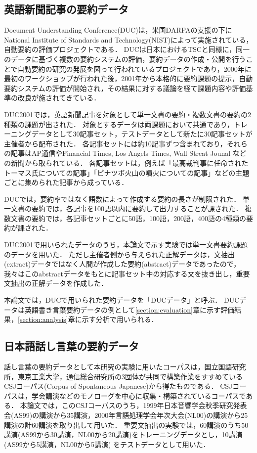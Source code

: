 \subsection{英語新聞記事の要約データ}
\label{section:data_duc}

Document Understanding Conference(DUC)は，米国DARPAの支援の下にNational Institute of Standards and Technology(NIST)によって実施されている，自動要約の評価プロジェクトである\cite{DUC:2001}．
DUCは日本におけるTSCと同様に，同一のデータに基づく複数の要約システムの評価，要約データの作成・公開を行うことで自動要約の研究の発展を図って行われているプロジェクトであり，2000年に最初のワークショップが行われた後，2001年から本格的に要約課題の提示，自動要約システムの評価が開始され，その結果に対する議論を経て課題内容や評価基準の改良が施されてきている．

DUC2001では，英語新聞記事を対象として単一文書の要約・複数文書の要約の2種類の課題が出された．
対象とするデータは両課題において共通であり，トレーニングデータとして30記事セット，テストデータとして新たに30記事セットが主催者から配布された．
各記事セットには約10記事ずつ含まれており，それらの記事はAP通信やFinancial Times, Los Angels Times, Wall Streat Jounal などの新聞から取られている．
各記事セットは，例えば「最高裁判事に任命されたトーマス氏についての記事」「ピナツボ火山の噴火についての記事」などの主題ごとに集められた記事から成っている．

DUCでは，要約率ではなく語数によって作成する要約の長さが制限された．
単一文書の要約では，各記事を100語以内に要約して出力することが課された．
複数文書の要約では，各記事セットごとに50語，100語，200語，400語の4種類の要約が課された．

DUC2001で用いられたデータのうち，本論文で示す実験では単一文書要約課題のデータを用いた．
ただし主催者側から与えられた正解データは，文抽出(extract)データではなく人間が作成した要約(abstract)データであったので，我々はこのabstractデータをもとに記事セット中の対応する文を抜き出し，重要文抽出の正解データを作成した．

本論文では，DUCで用いられた要約データを「DUCデータ」と呼ぶ．
DUCデータは英語書き言葉要約データの例として\ref{section:evaluation}章に示す評価結果，\ref{section:analysis}章に示す分析で用いられる．

\subsection{日本語話し言葉の要約データ}
\label{section:data_csj}

話し言葉の要約データとして本研究の実験に用いたコーパスは，国立国語研究所，東京工業大学，通信総合研究所の3団体が共同で構築作業をすすめているCSJコーパス(Corpus of Spontaneous Japanese)\cite{furui:asj2000}から得たものである．
CSJコーパスは，学会講演などのモノローグを中心に収集・構築されているコーパスである．
本論文では，このCSJコーパスのうち，1999年日本音響学会秋季研究発表会(AS99)の講演から35講演，2000年言語処理学会年次大会(NL00)の講演から25講演の計60講演を取り出して用いた．
重要文抽出の実験では，60講演のうち50講演(AS99から30講演，NL00から20講演)をトレーニングデータとし，10講演(AS99から5講演，NL00から5講演) をテストデータとして用いた．

